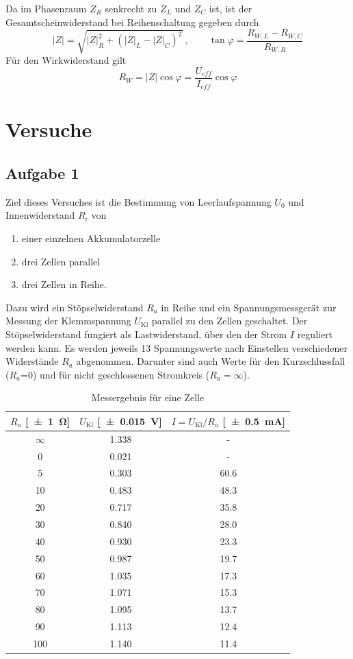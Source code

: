Da im Phasenraum $ Z_{R} $ senkrecht zu $ Z_{L} $ und $ Z_{C} $ ist, ist der Gesamtscheinwiderstand bei Reihenschaltung gegeben durch
\begin{equation}
	|Z| = \sqrt{|Z|_{R}^2 + (|Z|_{L} - |Z|_{C})^2}~,\qquad \tan\varphi = \frac{R_{W,L} - R_{W,C}}{R_{W,R}} \label{eq:Induk}
\end{equation}
Für den Wirkwiderstand gilt
\begin{equation}
	R_W = |Z| \cos\varphi = \frac{U_{eff}}{I_{eff}} \cos\varphi \label{eq:wirkohm}
\end{equation}
\section{Versuche}
\subsection{Aufgabe 1}
Ziel dieses Versuches ist die Bestimmung von Leerlaufspannung $U_0$ und Innenwiderstand $R_i$ von
\begin{enumerate}
  \item einer einzelnen Akkumulatorzelle
  \item drei Zellen parallel
  \item drei Zellen in Reihe.
\end{enumerate}
Dazu wird ein Stöpselwiderstand $R_a$ in Reihe und ein Spannungsmessgerät zur Messung der Klemmspannung $U_{\text{Kl}}$ parallel zu den Zellen geschaltet. Der Stöpselwiderstand fungiert als Lastwiderstand, über den der Strom $I$ reguliert werden kann. Es werden jeweils 13 Spannungswerte nach Einstellen verschiedener Widerstände $R_a$ abgenommen. Darunter sind auch Werte für den Kurzschlussfall ($R_a$=0) und für nicht geschlossenen Stromkreis ($R_a=\infty$).
\begin{table}[H]
  \centering
  \begin{tabular}{c c c} \toprule
    $R_a$ [\SI{\pm1}{\ohm}] & $U_{\text{Kl}}$ [\SI{\pm .015}{V}] & $I=U_{\text{Kl}}/R_a$ [\SI{\pm .5}{mA}] \\ \midrule
    $\infty$ & \num{1.338} & - \\
    0 & \num{0.021} & - \\
    5 & \num{0.303} & \num{60.6} \\
    10 & \num{.483} & \num{48.3} \\
    20 & \num{.717} & \num{35.8} \\
    30 & \num{.840} & \num{28.0} \\
    40 & \num{.930} & \num{23.3} \\
    50 & \num{.987} & \num{19.7} \\
    60 & \num{1.035} & \num{17.3} \\
    70 & \num{1.071} & \num{15.3} \\
    80 & \num{1.095} & \num{13.7} \\
    90 & \num{1.113} & \num{12.4} \\
    100 & \num{1.140} & \num{11.4} \\ \bottomrule
  \end{tabular}
  \caption{Messergebnis für eine Zelle}
  \label{tab:einezelle}
\end{table}

